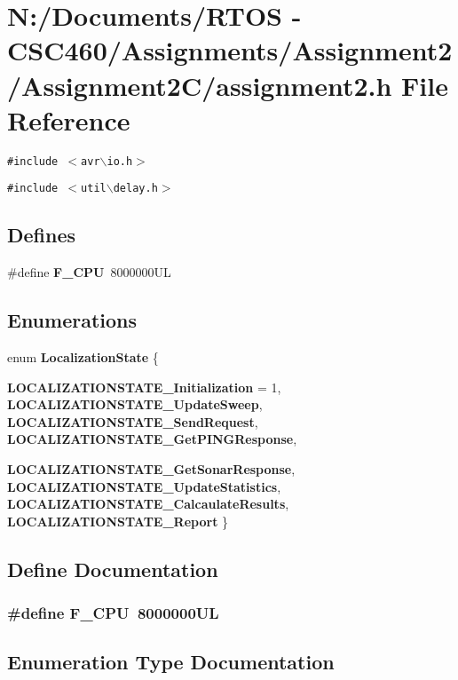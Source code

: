 \section{N:/Documents/RTOS - CSC460/Assignments/Assignment2/Assignment2C/assignment2.h File Reference}
\label{assignment2_8h}
{\tt \#include $<$avr$\backslash$io.h$>$}\par
{\tt \#include $<$util$\backslash$delay.h$>$}\par
\subsection*{Defines}
\begin{CompactItemize}
\item 
\#define {\bf F\_\-CPU}~8000000UL
\end{CompactItemize}
\subsection*{Enumerations}
\begin{CompactItemize}
\item 
enum {\bf Localization\-State} \{ \par
{\bf LOCALIZATIONSTATE\_\-Initialization} =  1, 
{\bf LOCALIZATIONSTATE\_\-Update\-Sweep}, 
{\bf LOCALIZATIONSTATE\_\-Send\-Request}, 
{\bf LOCALIZATIONSTATE\_\-Get\-PINGResponse}, 
\par
{\bf LOCALIZATIONSTATE\_\-Get\-Sonar\-Response}, 
{\bf LOCALIZATIONSTATE\_\-Update\-Statistics}, 
{\bf LOCALIZATIONSTATE\_\-Calcaulate\-Results}, 
{\bf LOCALIZATIONSTATE\_\-Report}
 \}
\end{CompactItemize}


\subsection{Define Documentation}
\subsubsection{\setlength{\rightskip}{0pt plus 5cm}\#define F\_\-CPU~8000000UL}\label{assignment2_8h_43bafb28b29491ec7f871319b5a3b2f8}




\subsection{Enumeration Type Documentation}
